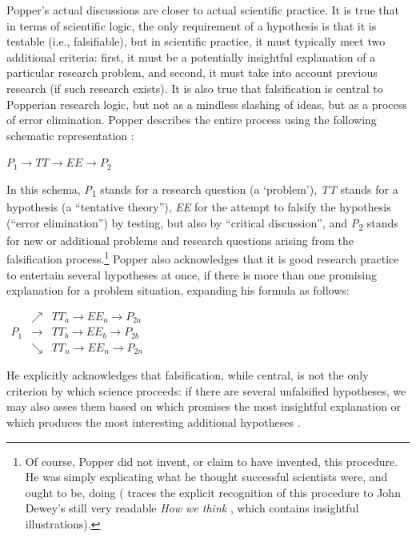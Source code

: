 Popper's actual discussions are closer to actual scientific practice. It is true that in terms of scientific logic, the only requirement of a hypothesis is that it is testable (i.e., falsifiable), but in scientific practice, it must typically meet two additional criteria: first, it must be a potentially insightful explanation of a particular research problem, and second, it must take into account previous research (if such research exists). It is also true that falsification is central to Popperian research logic, but not as a mindless slashing of ideas, but as a process of error elimination. Popper describes the entire process using the following schematic representation \citep[3]{yourgrau_realist_1970}:

\begin{exe}
\ex $P_{1} \rightarrow TT \rightarrow EE \rightarrow P_{2}$
\label{ex:popperscience}
\end{exe}

In this schema, \textit{P}\textsubscript{1} stands for a research question (a `problem'), \textit{TT} stands for a hypothesis (a ``tentative theory''), \textit{EE} for the attempt to falsify the hypothesis (``error elimination'') by testing, but also by ``critical discussion'', and \textit{P}\textsubscript{2} stands for new or additional problems and research questions arising from the falsification process.\footnote{Of course, Popper did not invent, or claim to have invented, this procedure. He was simply explicating what he thought successful scientists were, and ought to be, doing (\citet{rudolph_epistemology_2005} traces the explicit recognition of this procedure to John Dewey's still very readable \textit{How we think} \citep{dewey_how_1910}, which contains insightful illustrations).} Popper also acknowledges that it is good research practice to entertain several hypotheses at once, if there is more than one promising explanation for a problem situation, expanding his formula as follows:

\begin{exe}
\ex 
$\begin{matrix}
 & \nearrow & TT_{a} \rightarrow EE_{a} \rightarrow P_{2a}\\ 
P_{1} & \rightarrow  & TT_{b} \rightarrow EE_{b} \rightarrow P_{2b}\\ 
 & \searrow & TT_{n} \rightarrow EE_{n} \rightarrow P_{2n}
\end{matrix}$
\label{ex:poppersciences}
\end{exe}

He explicitly acknowledges that falsification, while central, is not the only criterion by which science proceeds: if there are several unfalsified hypotheses, we may also asses them based on which promises the most insightful explanation or which produces the most interesting additional hypotheses \citep[3]{yourgrau_realist_1970}.

